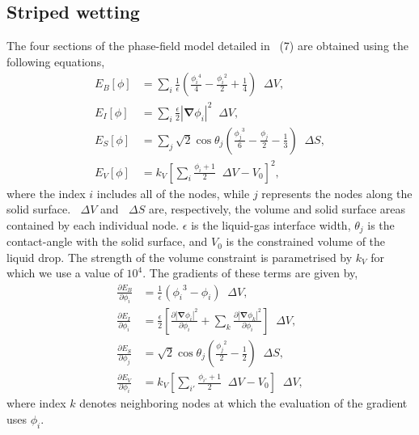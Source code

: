 \documentclass[aps,physrev,10pt]{revtex4-2}
\newcommand{\abs}[1]{\left| #1 \right|}
\newcommand{\grad}{\bm{\nabla}}
\newcommand{\upDelta}{\mathop{}\!\Delta}
\begin{document}
\subsection{Striped wetting}
The four sections of the phase-field model detailed in ~(7) are obtained using the following equations,
\begin{align}
  E_B[\phi] &= \sum_i \frac{1}{\epsilon} \left( \frac{{\phi_i}^4}{4} - \frac{{\phi_i}^2}{2} + \frac{1}{4} \right) \upDelta V,\\
  E_I[\phi] &= \sum_i \frac{\epsilon}{2} \abs{\grad \phi_i}^2 \upDelta V,\\
  E_S[\phi] &= \sum_j \sqrt{2}\cos\theta_j \left( \frac{{\phi_j}^3}{6} - \frac{\phi_j}{2} - \frac{1}{3} \right) \upDelta S,\\
  E_V[\phi] &= k_V \left[ \sum_i \frac{\phi_i + 1}{2} \upDelta V - V_0 \right]^2,
\end{align}
where the index $i$ includes all of the nodes, while $j$ represents the nodes along the solid surface.
$\upDelta V$ and $\upDelta S$ are, respectively, the volume and solid surface areas contained by each individual node.
$\epsilon$ is the liquid-gas interface width, $\theta_j$ is the contact-angle with the solid surface, and $V_0$ is the constrained volume of the liquid drop.
The strength of the volume constraint is parametrised by $k_V$ for which we use a value of $10^4$.
The gradients of these terms are given by,
\begin{align}
  \frac{\partial E_B}{\partial \phi_i} &= \frac{1}{\epsilon} \left( {\phi_i}^3 - \phi_i \right) \upDelta V,\\
  \frac{\partial E_I}{\partial \phi_i} &= \frac{\epsilon}{2} \left[
    \frac{\partial \abs{\grad \phi_i}^2}{\partial \phi_i} +
    \sum_k\frac{\partial \abs{\grad \phi_k}^2}{\partial \phi_i} \right] \upDelta V,\\
  \frac{\partial E_S}{\partial \phi_j} &= \sqrt{2}\cos\theta_j \left( \frac{{\phi_j}^2}{2} - \frac{1}{2} \right) \upDelta S,\\
  \frac{\partial E_V}{\partial \phi_i} &= k_V \left[ \sum_{i'} \frac{\phi_{i'} + 1}{2} \upDelta V - V_0 \right] \upDelta V,
\end{align}
where index $k$ denotes neighboring nodes at which the evaluation of the gradient uses $\phi_i$.


\newpage
\end{document}
